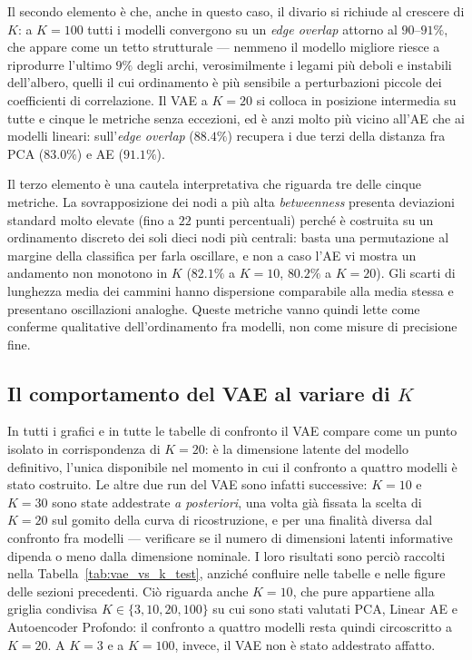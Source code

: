 Il secondo elemento è che, anche in questo caso, il divario si richiude al crescere di $K$: a $K=100$ tutti i modelli convergono su un \emph{edge overlap} attorno al $90$--$91\%$, che appare come un tetto strutturale --- nemmeno il modello migliore riesce a riprodurre l'ultimo $9\%$ degli archi, verosimilmente i legami più deboli e instabili dell'albero, quelli il cui ordinamento è più sensibile a perturbazioni piccole dei coefficienti di correlazione. Il VAE a $K=20$ si colloca in posizione intermedia su tutte e cinque le metriche senza eccezioni, ed è anzi molto più vicino all'AE che ai modelli lineari: sull'\emph{edge overlap} ($88.4\%$) recupera i due terzi della distanza fra PCA ($83.0\%$) e AE ($91.1\%$).

Il terzo elemento è una cautela interpretativa che riguarda tre delle cinque metriche. La sovrapposizione dei nodi a più alta \emph{betweenness} presenta deviazioni standard molto elevate (fino a $22$ punti percentuali) perché è costruita su un ordinamento discreto dei soli dieci nodi più centrali: basta una permutazione al margine della classifica per farla oscillare, e non a caso l'AE vi mostra un andamento non monotono in $K$ ($82.1\%$ a $K=10$, $80.2\%$ a $K=20$). Gli scarti di lunghezza media dei cammini hanno dispersione comparabile alla media stessa e presentano oscillazioni analoghe. Queste metriche vanno quindi lette come conferme qualitative dell'ordinamento fra modelli, non come misure di precisione fine.

\subsection{Il comportamento del VAE al variare di \texorpdfstring{$K$}{K}}
\label{subsec:vae_vs_k}

In tutti i grafici e in tutte le tabelle di confronto il VAE compare come un punto isolato in corrispondenza di $K=20$: è la dimensione latente del modello definitivo, l'unica disponibile nel momento in cui il confronto a quattro modelli è stato costruito. Le altre due run del VAE sono infatti successive: $K=10$ e $K=30$ sono state addestrate \emph{a posteriori}, una volta già fissata la scelta di $K=20$ sul gomito della curva di ricostruzione, e per una finalità diversa dal confronto fra modelli --- verificare se il numero di dimensioni latenti informative dipenda o meno dalla dimensione nominale. I loro risultati sono perciò raccolti nella Tabella~\ref{tab:vae_vs_k_test}, anziché confluire nelle tabelle e nelle figure delle sezioni precedenti. Ciò riguarda anche $K=10$, che pure appartiene alla griglia condivisa $K\in\{3,10,20,100\}$ su cui sono stati valutati PCA, Linear AE e Autoencoder Profondo: il confronto a quattro modelli resta quindi circoscritto a $K=20$. A $K=3$ e a $K=100$, invece, il VAE non è stato addestrato affatto.

